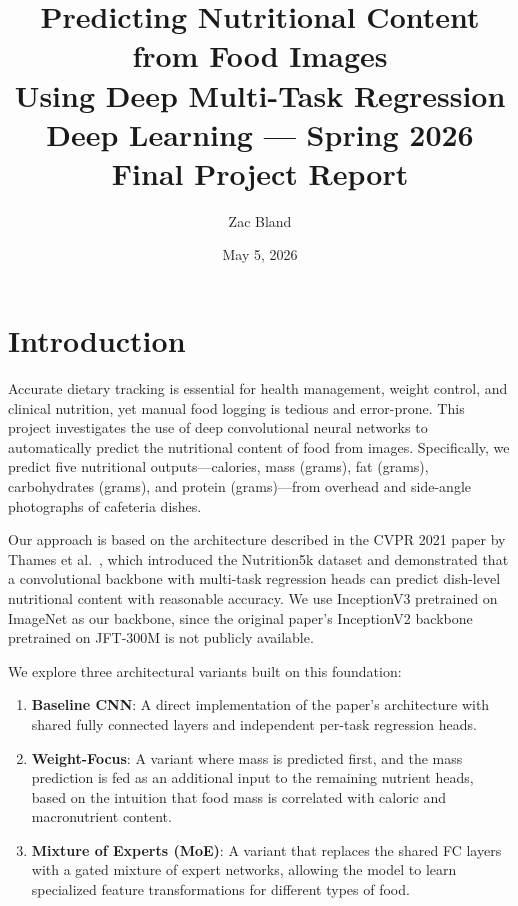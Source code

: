 \documentclass[11pt,a4paper]{article}
\title{%
  \textbf{Predicting Nutritional Content from Food Images\\Using Deep Multi-Task Regression}\\[0.5em]
  \large Deep Learning --- Spring 2026 Final Project Report
}
\author{Zac Bland}
\date{May 5, 2026}
\begin{document}
\maketitle

\section{Introduction}

Accurate dietary tracking is essential for health management, weight control, and clinical nutrition, yet manual food logging is tedious and error-prone. This project investigates the use of deep convolutional neural networks to automatically predict the nutritional content of food from images. Specifically, we predict five nutritional outputs---calories, mass (grams), fat (grams), carbohydrates (grams), and protein (grams)---from overhead and side-angle photographs of cafeteria dishes.

Our approach is based on the architecture described in the CVPR 2021 paper by Thames et al.\ \cite{thames2021}, which introduced the Nutrition5k dataset and demonstrated that a convolutional backbone with multi-task regression heads can predict dish-level nutritional content with reasonable accuracy. We use InceptionV3 \cite{szegedy2016} pretrained on ImageNet \cite{deng2009} as our backbone, since the original paper's InceptionV2 backbone pretrained on JFT-300M is not publicly available.

We explore three architectural variants built on this foundation:
\begin{enumerate}
  \item \textbf{Baseline CNN}: A direct implementation of the paper's architecture with shared fully connected layers and independent per-task regression heads.
  \item \textbf{Weight-Focus}: A variant where mass is predicted first, and the mass prediction is fed as an additional input to the remaining nutrient heads, based on the intuition that food mass is correlated with caloric and macronutrient content.
  \item \textbf{Mixture of Experts (MoE)}: A variant that replaces the shared FC layers with a gated mixture of expert networks, allowing the model to learn specialized feature transformations for different types of food.
\end{enumerate}
\end{document}
